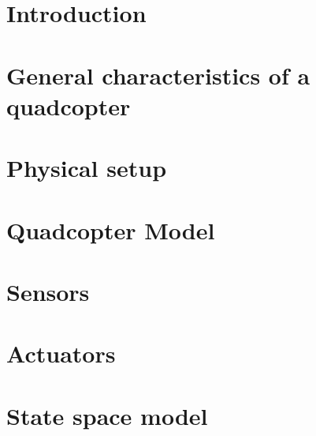 




\sloppy
{}


\cleardoublepage

\date{\today}
\cleardoublepage

\tableofcontents

\cleardoublepage



\chapter{Introduction}\label{ch:introduction}

\clearpage

\chapter{General characteristics of a quadcopter}\label{ch:problemdesc}


\clearpage

\chapter{Physical setup}\label{ch:psetup}


\clearpage

\chapter{Quadcopter Model}\label{ch:quadmodelling}

\clearpage

%

\chapter{Sensors}\label{ch:lab}


\clearpage
\chapter{Actuators}\label{ch:lab}


\clearpage

\chapter{State space model}\label{ch:lab}

\clearpage

